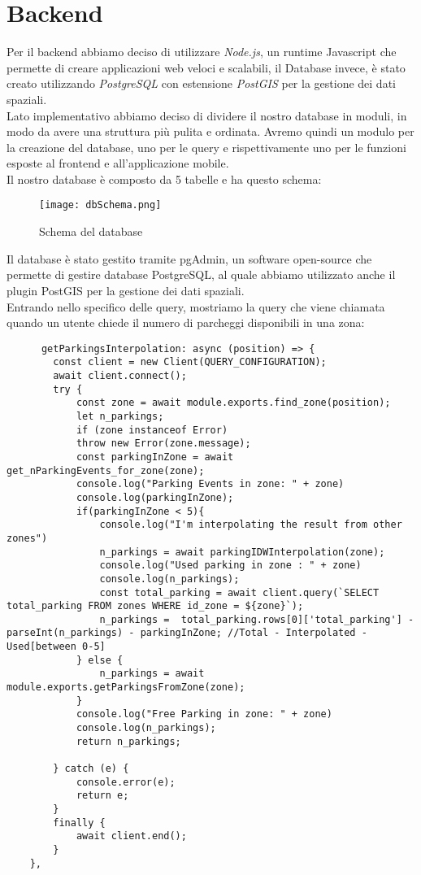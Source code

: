 \documentclass[../../Report.tex]{subfiles}
\begin{document}
\section{Backend}
    Per il backend abbiamo deciso di utilizzare \emph{Node.js}, un runtime Javascript che permette di creare applicazioni web veloci e scalabili, il Database invece, è stato creato utilizzando \emph{PostgreSQL} con estensione \emph{PostGIS} per la gestione dei dati spaziali.\\
    Lato implementativo abbiamo deciso di dividere il nostro database in moduli, in modo da avere una struttura più pulita e ordinata. Avremo quindi un modulo per la creazione del database, uno per le query e rispettivamente uno per le funzioni esposte al frontend e all'applicazione mobile.\\
    Il nostro database è composto da 5 tabelle e ha questo schema:
    \begin{figure}[H]
      \texttt{[image: dbSchema.png]}
      \centering
        \caption{Schema del database}
        \label{fig:schema}  
    \end{figure}
    Il database è stato gestito tramite pgAdmin, un software open-source che permette di gestire database PostgreSQL, al quale abbiamo utilizzato anche il plugin PostGIS per la gestione dei dati spaziali.\\
    Entrando nello specifico delle query, mostriamo la query che viene chiamata quando un utente chiede il numero di parcheggi disponibili in una zona:
    \begin{lstlisting}
      getParkingsInterpolation: async (position) => {
        const client = new Client(QUERY_CONFIGURATION);
        await client.connect();
        try {
            const zone = await module.exports.find_zone(position);
            let n_parkings;
            if (zone instanceof Error)
            throw new Error(zone.message);
            const parkingInZone = await get_nParkingEvents_for_zone(zone);
            console.log("Parking Events in zone: " + zone)
            console.log(parkingInZone);
            if(parkingInZone < 5){ 
                console.log("I'm interpolating the result from other zones")
                n_parkings = await parkingIDWInterpolation(zone);
                console.log("Used parking in zone : " + zone)
                console.log(n_parkings);
                const total_parking = await client.query(`SELECT total_parking FROM zones WHERE id_zone = ${zone}`);
                n_parkings =  total_parking.rows[0]['total_parking'] - parseInt(n_parkings) - parkingInZone; //Total - Interpolated - Used[between 0-5]
            } else {
                n_parkings = await module.exports.getParkingsFromZone(zone);
            }
            console.log("Free Parking in zone: " + zone)
            console.log(n_parkings);
            return n_parkings;
            
        } catch (e) {
            console.error(e);
            return e;
        }
        finally {
            await client.end();
        }
    },
    \end{lstlisting}
\end{document}

